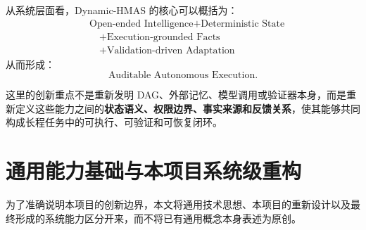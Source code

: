 \documentclass[UTF8,a4paper,12pt,oneside]{ctexbook}
\begin{document}
从系统层面看，Dynamic-HMAS 的核心可以概括为：
\[
\boxed{
\begin{aligned}
&\text{Open-ended Intelligence} + \text{Deterministic State} \\[3pt]
&\quad + \text{Execution-grounded Facts} \\[3pt]
&\quad + \text{Validation-driven Adaptation}
\end{aligned}
}
\]
从而形成：
\[
\text{Auditable Autonomous Execution}.
\]

这里的创新重点不是重新发明 DAG、外部记忆、模型调用或验证器本身，而是重新定义这些能力之间的\textbf{状态语义、权限边界、事实来源和反馈关系}，使其能够共同构成长程任务中的可执行、可验证和可恢复闭环。


\section{通用能力基础与本项目系统级重构}

为了准确说明本项目的创新边界，本文将通用技术思想、本项目的重新设计以及最终形成的系统能力区分开来，而不将已有通用概念本身表述为原创。
\end{document}
